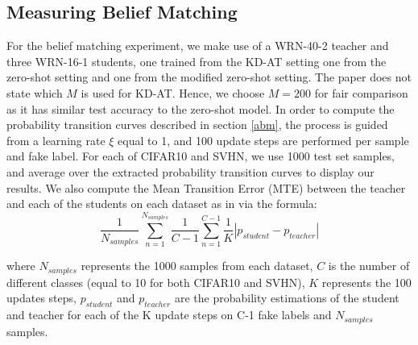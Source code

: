 \subsection{Measuring Belief Matching}

For the belief matching experiment, we make use of a WRN-40-2 teacher and three WRN-16-1 students, one trained from the KD-AT setting one from the zero-shot setting and one from the modified zero-shot setting. The paper does not state which $M$ is used for KD-AT. Hence, we choose $M=200$ for fair comparison as it has similar test accuracy to the zero-shot model. In order to compute the probability transition curves described in section \ref{abm}, the process is guided from a learning rate $\xi$ equal to 1, and 100 update steps are performed per sample and fake label. For each of CIFAR10 and SVHN, we use 1000 test set samples, and average over the extracted probability transition curves to display our results. We also compute the Mean Transition Error (MTE) between the teacher and each of the students on each dataset as in \cite{zagoruyko2016paying} via the formula:
\useshortskip
\begin{equation}
    \frac{1}{N_{samples}} \sum_{n=1}^{N_{samples}} \frac{1}{C-1} \sum_{n=1}^{C-1} \frac{1}{K} |p_{student} - p_{teacher}|
    \label{MTE}
\end{equation}
\useshortskip

where $N_{samples}$ represents the 1000 samples from each dataset, $C$ is the number of different classes (equal to 10 for both CIFAR10 and SVHN), $K$ represents the 100 updates steps, $p_{student}$ and $p_{teacher}$ are the probability estimations of the student and teacher for each of the K update steps on C-1 fake labels and $N_{samples}$ samples. 
